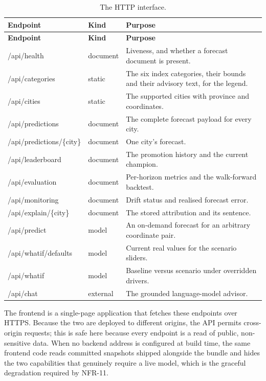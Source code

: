 \begin{xltabular}{\textwidth}{P{4.5cm} Q{1.6cm} Y}
\caption{The HTTP interface.}\label{tab:api}\\
\toprule
\bfseries Endpoint & \bfseries Kind & \bfseries Purpose \\
\midrule
\endfirsthead
\toprule
\bfseries Endpoint & \bfseries Kind & \bfseries Purpose \\
\midrule
\endhead
\bottomrule
\endlastfoot
/api/health & document & Liveness, and whether a forecast document is present. \\
/api/categories & static & The six index categories, their bounds and their
advisory text, for the legend. \\
/api/cities & static & The supported cities with province and coordinates. \\
/api/predictions & document & The complete forecast payload for every city. \\
/api/predictions/\{city\} & document & One city's forecast. \\
/api/leaderboard & document & The promotion history and the current champion. \\
/api/evaluation & document & Per-horizon metrics and the walk-forward backtest. \\
/api/monitoring & document & Drift status and realised forecast error. \\
/api/explain/\{city\} & document & The stored attribution and its sentence. \\
/api/predict & model & An on-demand forecast for an arbitrary coordinate pair. \\
/api/whatif/defaults & model & Current real values for the scenario sliders. \\
/api/whatif & model & Baseline versus scenario under overridden drivers. \\
/api/chat & external & The grounded language-model advisor. \\
\end{xltabular}

The frontend is a single-page application that fetches these endpoints over
HTTPS. Because the two are deployed to different origins, the API permits
cross-origin requests; this is safe here because every endpoint is a read of
public, non-sensitive data. When no backend address is configured at build time,
the same frontend code reads committed snapshots shipped alongside the bundle and
hides the two capabilities that genuinely require a live model, which is the
graceful degradation required by NFR-11.

